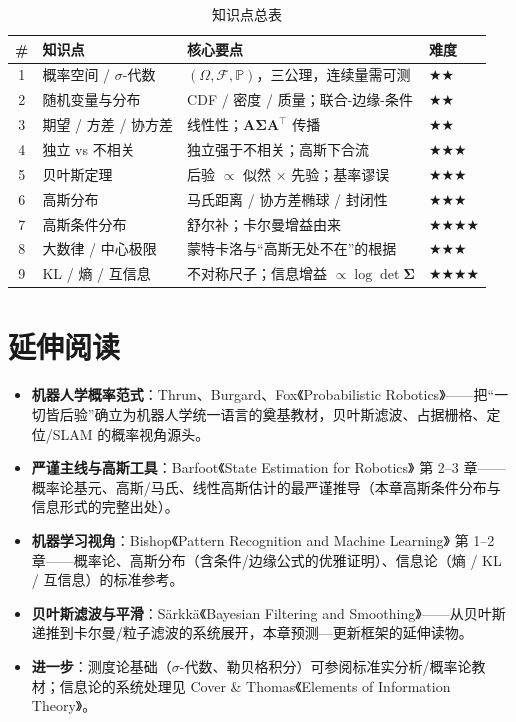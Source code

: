 \begin{table}[H]\centering\small
\caption{知识点总表}
\begin{tabular}{clll}
\toprule
\# & 知识点 & 核心要点 & 难度 \\
\midrule
1 & 概率空间 / $\sigma$-代数 & $(\Omega,\mathcal{F},\mathbb{P})$，三公理，连续量需可测 & \(\bigstar\bigstar\) \\
2 & 随机变量与分布 & CDF / 密度 / 质量；联合-边缘-条件 & \(\bigstar\bigstar\) \\
3 & 期望 / 方差 / 协方差 & 线性性；$\mathbf{A}\boldsymbol{\Sigma}\mathbf{A}^\top$ 传播 & \(\bigstar\bigstar\) \\
4 & 独立 vs 不相关 & 独立强于不相关；高斯下合流 & \(\bigstar\bigstar\bigstar\) \\
5 & 贝叶斯定理 & 后验 $\propto$ 似然 $\times$ 先验；基率谬误 & \(\bigstar\bigstar\bigstar\) \\
6 & 高斯分布 & 马氏距离 / 协方差椭球 / 封闭性 & \(\bigstar\bigstar\bigstar\) \\
7 & 高斯条件分布 & 舒尔补；卡尔曼增益由来 & \(\bigstar\bigstar\bigstar\bigstar\) \\
8 & 大数律 / 中心极限 & 蒙特卡洛与“高斯无处不在”的根据 & \(\bigstar\bigstar\bigstar\) \\
9 & KL / 熵 / 互信息 & 不对称尺子；信息增益 $\propto\log\det\boldsymbol{\Sigma}$ & \(\bigstar\bigstar\bigstar\bigstar\) \\
\bottomrule
\end{tabular}
\end{table}

\section*{延伸阅读}
\begin{itemize}
  \item \textbf{机器人学概率范式}：Thrun、Burgard、Fox《Probabilistic Robotics》\cite{thrun2005probabilistic}——把“一切皆后验”确立为机器人学统一语言的奠基教材，贝叶斯滤波、占据栅格、定位/SLAM 的概率视角源头。
  \item \textbf{严谨主线与高斯工具}：Barfoot《State Estimation for Robotics》\cite{barfoot2024state} 第 2--3 章——概率论基元、高斯/马氏、线性高斯估计的最严谨推导（本章高斯条件分布与信息形式的完整出处）。
  \item \textbf{机器学习视角}：Bishop《Pattern Recognition and Machine Learning》\cite{bishop2006prml} 第 1--2 章——概率论、高斯分布（含条件/边缘公式的优雅证明）、信息论（熵 / KL / 互信息）的标准参考。
  \item \textbf{贝叶斯滤波与平滑}：Särkkä《Bayesian Filtering and Smoothing》\cite{sarkka2013bayesian}——从贝叶斯递推到卡尔曼/粒子滤波的系统展开，本章预测—更新框架的延伸读物。
  \item \textbf{进一步}：测度论基础（$\sigma$-代数、勒贝格积分）可参阅标准实分析/概率论教材；信息论的系统处理见 Cover \& Thomas《Elements of Information Theory》。
\end{itemize}

